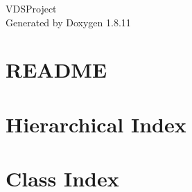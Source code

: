 \documentclass[twoside]{book}
\newcommand{\+}{\discretionary{\mbox{\scriptsize$\hookleftarrow$}}{}{}}
\newcommand{\clearemptydoublepage}{%
  \newpage{\pagestyle{empty}\cleardoublepage}%
}
\begin{document}
\begin{titlepage}
\vspace*{7cm}
\begin{center}%
{\Large V\+D\+S\+Project }\\
\vspace*{1cm}
{\large Generated by Doxygen 1.8.11}\\
\end{center}
\end{titlepage}
\clearemptydoublepage
\tableofcontents
\clearemptydoublepage
{}

\chapter{R\+E\+A\+D\+ME}
\label{md__home_felipe_Desktop_vdsproject_vdscp_04_src_bench_README}

\chapter{Hierarchical Index}

\chapter{Class Index}

\end{document}
